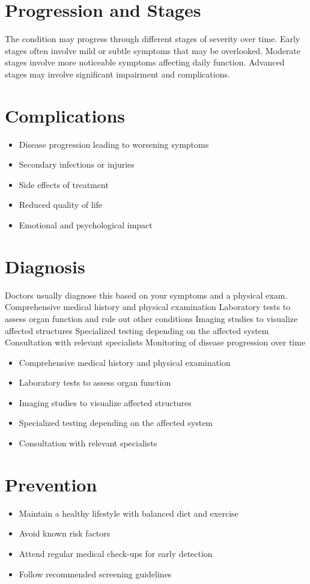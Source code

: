 \section{Progression and Stages}
The condition may progress through different stages of severity over time. Early stages often involve mild or subtle symptoms that may be overlooked. Moderate stages involve more noticeable symptoms affecting daily function. Advanced stages may involve significant impairment and complications.
\section{Complications}
\begin{itemize}[noitemsep]
  \item Disease progression leading to worsening symptoms
  \item Secondary infections or injuries
  \item Side effects of treatment
  \item Reduced quality of life
  \item Emotional and psychological impact
\end{itemize}
\section{Diagnosis}
Doctors usually diagnose this based on your symptoms and a physical exam. Comprehensive medical history and physical examination Laboratory tests to assess organ function and rule out other conditions Imaging studies to visualize affected structures Specialized testing depending on the affected system Consultation with relevant specialists Monitoring of disease progression over time

\begin{itemize}[noitemsep]
  \item Comprehensive medical history and physical examination
  \item Laboratory tests to assess organ function
  \item Imaging studies to visualize affected structures
  \item Specialized testing depending on the affected system
  \item Consultation with relevant specialists
\end{itemize}
\section{Prevention}
\begin{itemize}[noitemsep]
  \item Maintain a healthy lifestyle with balanced diet and exercise
  \item Avoid known risk factors
  \item Attend regular medical check-ups for early detection
  \item Follow recommended screening guidelines
\end{itemize}
